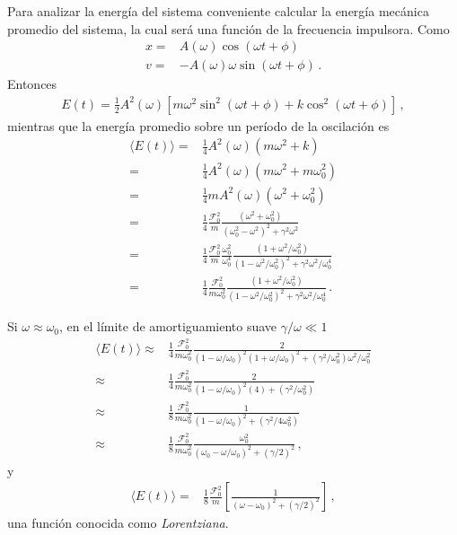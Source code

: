 Para analizar la energía del sistema conveniente calcular la energía mecánica promedio del sistema, la cual será una función de la frecuencia impulsora. Como
\begin{align*}
  x=& A(\omega)\cos(\omega t +\phi)\nonumber\\
  v=& -A(\omega)\omega\sin(\omega t +\phi)\,.
\end{align*}
Entonces
\begin{align*}
  E(t)=\tfrac{1}{2}A^2(\omega)\left[m\omega^2\sin^2(\omega t+\phi)+k\cos^2(\omega t +\phi)\right]\,,
\end{align*}
mientras que la energía promedio sobre un período de la oscilación es
\begin{align*}
  \langle E(t)\rangle=&\tfrac{1}{4}A^2(\omega)(m\omega^2+k)\nonumber\\
=&\tfrac{1}{4}A^2(\omega)(m\omega^2+m\omega_0^2)\nonumber\\
=&\tfrac{1}{4}m A^2(\omega)(\omega^2+\omega_0^2)\nonumber\\
=&\frac{1}{4}\frac{\mathcal{F}_0^2}{m}\frac{(\omega^2+\omega_0^2)}{\left(\omega_0^2-\omega^2\right)^2+\gamma^2\omega^2}\nonumber\\
=&\frac{1}{4}\frac{\mathcal{F}_0^2}{m}\frac{\omega_0^2}{\omega_0^4}\frac{(1+{\omega^2}/{\omega_0^2})}{\left(1-\omega^2/\omega_0^2\right)^2+\gamma^2\omega^2/\omega_0^4}\nonumber\\
=&\frac{1}{4}\frac{\mathcal{F}_0^2}{m\omega_0^2}\frac{(1+{\omega^2}/{\omega_0^2})}{\left(1-\omega^2/\omega_0^2\right)^2+\gamma^2\omega^2/\omega_0^4}\,.
\end{align*}

Si $\omega\approx\omega_0$, en el límite de amortiguamiento suave $\gamma/\omega\ll1$
\begin{align*}
  \langle E(t)\rangle\approx&\frac{1}{4}\frac{\mathcal{F}_0^2}{m\omega_0^2}\frac{2}{(1-{\omega}/{\omega_0})^2(1+{\omega}/{\omega_0})^2+(\gamma^2/\omega_0^2)\omega^2/\omega_0^2}\nonumber\\
\approx&\frac{1}{4}\frac{\mathcal{F}_0^2}{m\omega_0^2}\frac{2}{(1-{\omega}/{\omega_0})^2(4)+(\gamma^2/\omega_0^2)}\nonumber\\
\approx&\frac{1}{8}\frac{\mathcal{F}_0^2}{m\omega_0^2}\frac{1}{(1-{\omega}/{\omega_0})^2+(\gamma^2/4\omega_0^2)}\nonumber\\
\approx&\frac{1}{8}\frac{\mathcal{F}_0^2}{m\omega_0^2}\frac{\omega_0^2}{(\omega_0-{\omega}/{\omega_0})^2+(\gamma/2)^2}\,,
\end{align*}
y
\begin{align*}
   \langle E(t)\rangle=&\frac{1}{8}\frac{\mathcal{F}_0^2}{m}
   \left[\frac{1}{(\omega-\omega_0)^2+(\gamma/2)^2}\right]\,,
\end{align*}
una función conocida como \emph{Lorentziana}.


